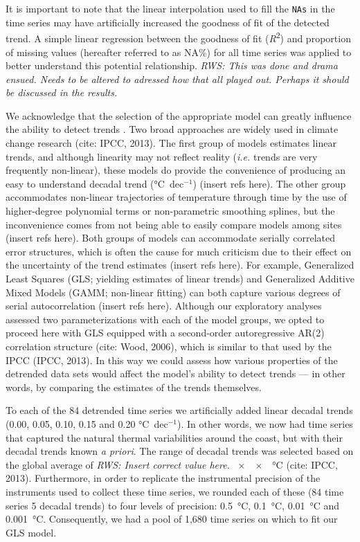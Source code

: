 \documentclass{ametsoc}
\begin{document}
It is important to note that the linear interpolation used to fill the \texttt{NAs} in the time series may have artificially increased the goodness of fit of the detected trend. A simple linear regression between the goodness of fit (\emph{R}\textsuperscript{2}) and proportion of missing values (hereafter referred to as NA\%) for all time series was applied to better understand this potential relationship. \emph{RWS: This was done and drama ensued. Needs to be altered to adressed how that all played out. Perhaps it should be discussed in the results.}

We acknowledge that the selection of the appropriate model can greatly influence the ability to detect trends \citet{Franzke2012}. Two broad approaches are widely used in climate change research (cite: IPCC, 2013). The first group of models estimates linear trends, and although linearity may not reflect reality (\emph{i.e.} trends are very frequently non-linear), these models do provide the convenience of producing an easy to understand decadal trend (\si{\degreeCelsius}~dec$^{-1}$) (insert refs here). The other group accommodates non-linear trajectories of temperature through time by the use of higher-degree polynomial terms or non-parametric smoothing splines, but the inconvenience comes from not being able to easily compare models among sites (insert refs here). Both groups of models can accommodate serially correlated error structures, which is often the cause for much criticism due to their effect on the uncertainty of the trend estimates (insert refs here). For example, Generalized Least Squares (GLS; yielding estimates of linear trends) and Generalized Additive Mixed Models (GAMM; non-linear fitting) can both capture various degrees of serial autocorrelation (insert refs here). Although our exploratory analyses assessed two parameterizations with each of the model groups, we opted to proceed here with GLS equipped with a second-order autoregressive AR(2) correlation structure (cite: Wood, 2006), which is similar to that used by the IPCC (IPCC, 2013). In this way we could assess how various properties of the detrended data sets would affect the model’s ability to detect trends --- in other words, by comparing the estimates of the trends themselves.

To each of the 84 detrended time series we artificially added linear decadal trends (0.00, 0.05, 0.10, 0.15 and 0.20 \si{\degreeCelsius}~dec$^{-1}$). In other words, we now had time series that captured the natural thermal variabilities around the coast, but with their decadal trends known \emph{a priori}. The range of decadal trends was selected based on the global average of \emph{RWS: Insert correct value here.} \SI{xx}{\degreeCelsius} (cite: IPCC, 2013). Furthermore, in order to replicate the instrumental precision of the instruments used to collect these time series, we rounded each of these (84 time series \texttimes{} 5 decadal trends) to four levels of precision: \SI{0.5}{\degreeCelsius}, \SI{0.1}{\degreeCelsius}, \SI{0.01}{\degreeCelsius} and \SI{0.001}{\degreeCelsius}. Consequently, we had a pool of 1,680 time series on which to fit our GLS model.
\end{document}
